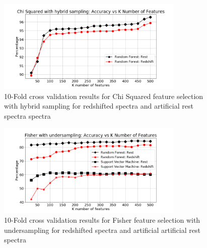 \documentclass[conference]{IEEEtran}
\begin{document}
        \begin{figure}
            \centering
            \includegraphics[width=3.5in]{Chi_Squared_Hybrid.png}
            \caption{10-Fold cross validation results for Chi Squared feature selection with hybrid sampling for redshifted spectra and artificial rest spectra spectra}
            \label{fig:chi-H}
        \end{figure}

	\begin{table}
\caption{10-Fold cross validation results for Chi Squared feature selection with hybrid sampling (367,004 samples) for redshifted spectra and artificial artificial rest spectra using Random Forest}
        \label{tab:chi-H}
\end{table}

        \begin{figure}
            \centering
            \includegraphics[width=3.5in]{Fisher_Undersampled.png}
            \caption{10-Fold cross validation results for Fisher feature selection with undersampling for redshifted spectra and artificial artificial rest spectra}
            \label{fig:fisher-U}
        \end{figure}
\end{document}
